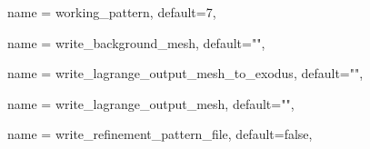\begin{parameter}{
    name = {working_pattern},
    default={7},
    }
\end{parameter}

\begin{parameter}{
    name = {write_background_mesh},
    default={""},
    }
\end{parameter}

\begin{parameter}{
    name = {write_lagrange_output_mesh_to_exodus},
    default={""},
    }
\end{parameter}

\begin{parameter}{
    name = {write_lagrange_output_mesh},
    default={""},
    }
\end{parameter}

\begin{parameter}{
    name = {write_refinement_pattern_file},
    default={false},
    }
\end{parameter}

